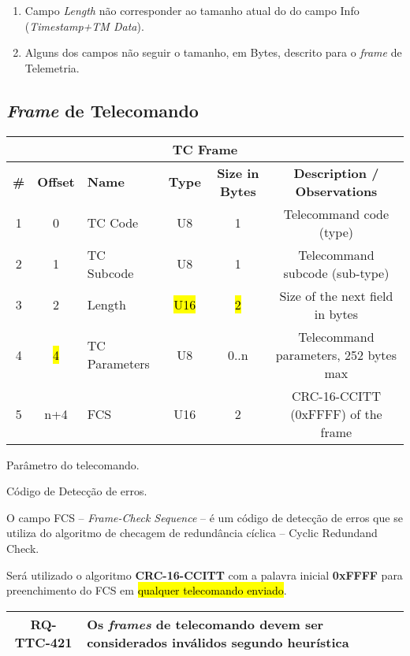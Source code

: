 \begin{enumerate}
    \item Campo \textit{Length} não corresponder ao tamanho atual do do campo Info (\textit{Timestamp+TM Data}).
    \item Alguns dos campos não seguir o tamanho, em Bytes, descrito para o \textit{frame} de Telemetria.
\end{enumerate}

\subsection{\textit{Frame} de Telecomando}

\begin{table}[H]
\begin{tabular}{|cclccc|}
\hline
\multicolumn{6}{|c|}{\textbf{TC Frame}} \\ \hline
\textbf{\#} & \textbf{Offset} & \textbf{Name} & \textbf{Type} & \textbf{Size in Bytes} & \textbf{Description / Observations} \\ \hline
1 & 0 & TC Code & U8 & 1 & Telecommand code (type) \\
2 & 1 & TC Subcode & U8 & 1 & Telecommand subcode (sub-type) \\
3 & 2 & Length & \hl{U16} & \hl{2} & Size of the next field in bytes \\ \hline
4 & \hl{4} & TC Parameters & U8 & 0..n & Telecommand parameters, 252 bytes max \\ 
5 & n+4 & FCS & U16 & 2 & CRC-16-CCITT (0xFFFF) of the frame\\ \hline
\end{tabular}
\end{table}

\begin{description}[align=right]
    \item[TC Param] Parâmetro do telecomando.
    \item[FCS] Código de Detecção de erros.
\end{description}

O campo FCS -- \textit{Frame-Check Sequence} -- é um código de detecção de erros que se utiliza do algoritmo de checagem de redundância cíclica -- Cyclic Redundand Check.

Será utilizado o algoritmo \textbf{CRC-16-CCITT} com a palavra inicial \textbf{0xFFFF} para preenchimento do FCS em \hl{qualquer telecomando enviado}.

\begin{table}[H]
    \centering
    \begin{tabular}{|c|p{}|}
        \hline
        \rowcolor{orange}
        \textbf{RQ-TTC-421} & \textbf{Os \textit{frames} de telecomando devem ser considerados inválidos segundo heurística} \\ \hline
    \end{tabular}
    \label{tab:rq-ttc-421}
\end{table}

